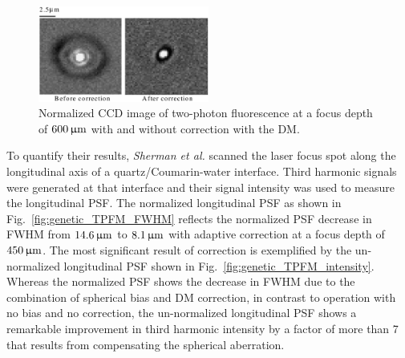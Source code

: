 \begin{figure}
	\centering
		\includegraphics[width=0.50\textwidth]{images/genetic_TPFM_correction}
	\caption{Normalized CCD image of two-photon fluorescence at a focus depth of $\unit[600]{\upmu m}$ with and without correction with the DM.~\cite{Genetic_MPFM}}
	\label{fig:genetic_TPFM_correction}
\end{figure}

To quantify their results, \emph{Sherman et al.} scanned the laser focus spot along the longitudinal axis of a quartz/Coumarin-water interface. Third harmonic signals were generated at that interface and their signal intensity was used to measure the longitudinal PSF. The normalized longitudinal PSF as shown in Fig.~\ref{fig:genetic_TPFM_FWHM} reflects the normalized PSF decrease in FWHM from $\unit[14.6]{\upmu m}$ to $\unit[8.1]{\upmu m}$ with adaptive correction at a focus depth of $\unit[450]{\upmu m}$. The most significant result of correction is exemplified by the un-normalized longitudinal PSF shown in Fig.~\ref{fig:genetic_TPFM_intensity}. Whereas the normalized PSF shows the decrease in FWHM due to the combination of spherical bias and DM correction, in contrast to operation with no bias and no correction, the un-normalized longitudinal PSF shows a remarkable improvement in third harmonic intensity by a factor of more than 7 that results from compensating the spherical aberration.

